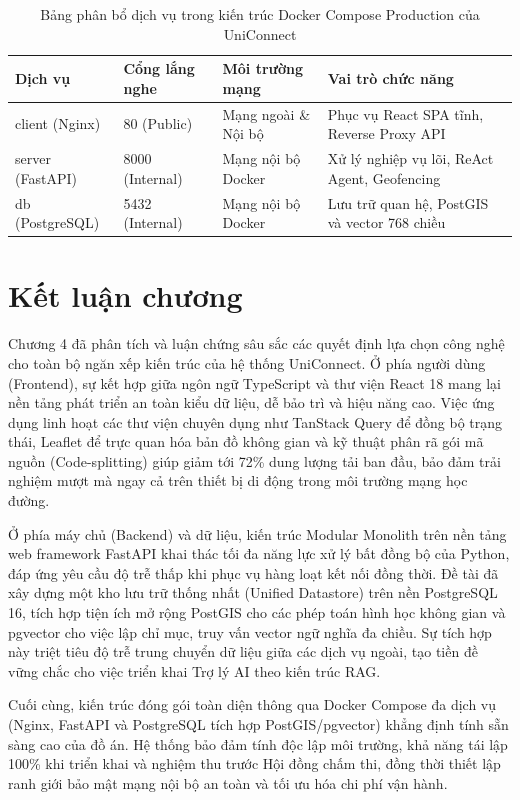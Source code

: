 \begin{table}[H]
\centering
\caption{Bảng phân bổ dịch vụ trong kiến trúc Docker Compose Production của UniConnect}
\label{tab:dual_deployment_matrix}
\begin{tabular}{|l|l|p{4.2cm}|p{4.5cm}|}
\hline
\textbf{Dịch vụ} & \textbf{Cổng lắng nghe} & \textbf{Môi trường mạng} & \textbf{Vai trò chức năng} \\ \hline
client (Nginx) & 80 (Public) & Mạng ngoài \& Nội bộ & Phục vụ React SPA tĩnh, Reverse Proxy API \\ \hline
server (FastAPI) & 8000 (Internal) & Mạng nội bộ Docker & Xử lý nghiệp vụ lõi, ReAct Agent, Geofencing \\ \hline
db (PostgreSQL) & 5432 (Internal) & Mạng nội bộ Docker & Lưu trữ quan hệ, PostGIS và vector 768 chiều \\ \hline
\end{tabular}
\end{table}

\section{Kết luận chương}

Chương 4 đã phân tích và luận chứng sâu sắc các quyết định lựa chọn công nghệ cho toàn bộ ngăn xếp kiến trúc của hệ thống UniConnect. Ở phía người dùng (Frontend), sự kết hợp giữa ngôn ngữ TypeScript và thư viện React 18 mang lại nền tảng phát triển an toàn kiểu dữ liệu, dễ bảo trì và hiệu năng cao. Việc ứng dụng linh hoạt các thư viện chuyên dụng như TanStack Query để đồng bộ trạng thái, Leaflet để trực quan hóa bản đồ không gian và kỹ thuật phân rã gói mã nguồn (Code-splitting) giúp giảm tới 72\% dung lượng tải ban đầu, bảo đảm trải nghiệm mượt mà ngay cả trên thiết bị di động trong môi trường mạng học đường.

Ở phía máy chủ (Backend) và dữ liệu, kiến trúc Modular Monolith trên nền tảng web framework FastAPI khai thác tối đa năng lực xử lý bất đồng bộ của Python, đáp ứng yêu cầu độ trễ thấp khi phục vụ hàng loạt kết nối đồng thời. Đề tài đã xây dựng một kho lưu trữ thống nhất (Unified Datastore) trên nền PostgreSQL 16, tích hợp tiện ích mở rộng PostGIS cho các phép toán hình học không gian và pgvector cho việc lập chỉ mục, truy vấn vector ngữ nghĩa đa chiều. Sự tích hợp này triệt tiêu độ trễ trung chuyển dữ liệu giữa các dịch vụ ngoài, tạo tiền đề vững chắc cho việc triển khai Trợ lý AI theo kiến trúc RAG.

Cuối cùng, kiến trúc đóng gói toàn diện thông qua Docker Compose đa dịch vụ (Nginx, FastAPI và PostgreSQL tích hợp PostGIS/pgvector) khẳng định tính sẵn sàng cao của đồ án. Hệ thống bảo đảm tính độc lập môi trường, khả năng tái lập 100\% khi triển khai và nghiệm thu trước Hội đồng chấm thi, đồng thời thiết lập ranh giới bảo mật mạng nội bộ an toàn và tối ưu hóa chi phí vận hành.